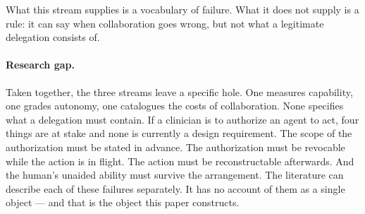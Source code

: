 What this stream supplies is a vocabulary of failure. What it does not supply is a rule: it can say when collaboration goes wrong, but not what a legitimate delegation consists of.

\paragraph{Research gap.}
Taken together, the three streams leave a specific hole. One measures capability, one grades autonomy, one catalogues the costs of collaboration. None specifies what a delegation must contain. If a clinician is to authorize an agent to act, four things are at stake and none is currently a design requirement. The scope of the authorization must be stated in advance. The authorization must be revocable while the action is in flight. The action must be reconstructable afterwards. And the human's unaided ability must survive the arrangement. The literature can describe each of these failures separately. It has no account of them as a single object --- and that is the object this paper constructs.
